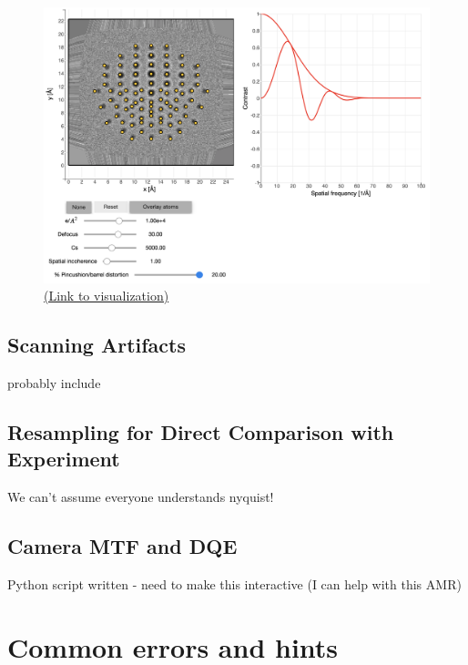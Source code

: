 \documentclass[%
 superscriptaddress,
 aip,
 amsmath,amssymb,
preprint,%
 author-year,%
longbibliography
]{revtex4-2}
\begin{document}
\begin{figure}[h]
    \includegraphics[width=1\textwidth]{figures/dose_distortions.png}
    \caption{ \href{https://tem-elements.herokuapp.com/voila/render/notebooks/dose_distortions.ipynb}{(Link to visualization)}}
    \label{vis:dose_distortions}
\end{figure}

\subsection*{Scanning Artifacts}

probably include



\subsection*{Resampling for Direct Comparison with Experiment}

We can't assume everyone understands nyquist!


\subsection*{Camera MTF and DQE}

Python script written - need to make this interactive (I can help with this AMR)



\section*{Common errors and hints}
\end{document}
